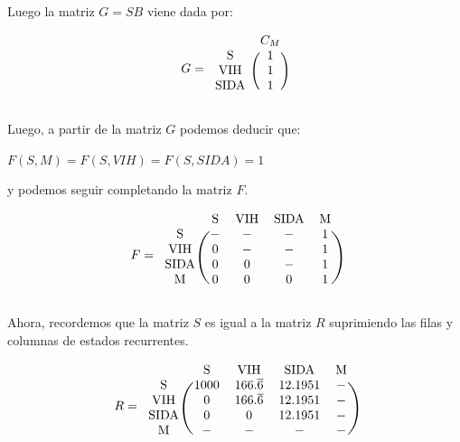 \documentclass[11pt]{article}
\begin{document}
Luego la matriz $ G = SB $ viene dada por: 

\begin{equation*}
  G = 
  \begin{blockarray}{cc}
     & C_M \\
    \begin{block}{c(c)}
      \text{S}    & 1 \\
      \text{VIH}  & 1 \\
      \text{SIDA} & 1  \\
    \end{block}
  \end{blockarray}
\end{equation*}

Luego, a partir de la matriz $G$ podemos deducir que:

$ F(S, M) = F(S, VIH) = F(S, SIDA) = 1 $

y podemos seguir completando la matriz $F$.

\begin{equation*}
  F = 
  \begin{blockarray}{ccccc}
     & \text{S} & \text{VIH} & \text{SIDA} & \text{M} \\
    \begin{block}{c(cccc)}
      \text{S}    & - & - & - & 1 \\
      \text{VIH}  & 0 & - & - & 1 \\
      \text{SIDA} & 0 & 0 & - & 1 \\
      \text{M}    & 0 & 0 & 0 & 1 \\
    \end{block}
  \end{blockarray}
\end{equation*}

Ahora, recordemos que la matriz $S$ es igual a la matriz $R$ suprimiendo las 
filas y columnas de estados recurrentes. 

\begin{equation*}
  R = 
  \begin{blockarray}{ccccc}
     & \text{S} & \text{VIH} & \text{SIDA} & \text{M}\\
    \begin{block}{c(cccc)}
      \text{S}    & 1000 & 166.\overline{6} & 12.1951 & -\\
      \text{VIH}  & 0    & 166.\overline{6} & 12.1951 & -\\
      \text{SIDA} & 0    & 0                & 12.1951 & -\\
      \text{M}    & -    & -                & -       & - \\
    \end{block}
  \end{blockarray}
\end{equation*}
\end{document}
